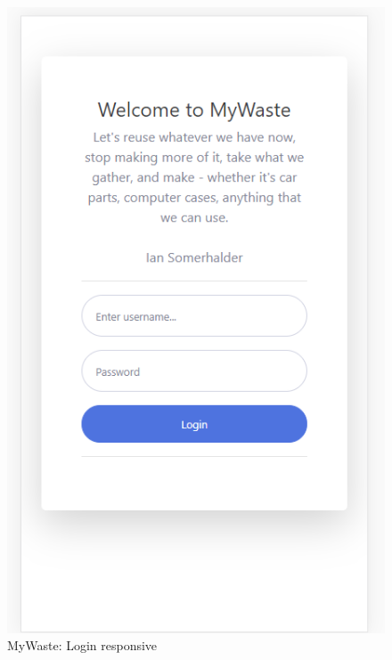 \documentclass{report}
\begin{document}
\begin{figure}[h!]
    \begin{center}
        \includegraphics[width=1.0\textwidth]{images/login_responsive.PNG}  \end{center}
    \caption{MyWaste: Login responsive}
    \label{fig:resplogin}
\end{figure}
\end{document}
